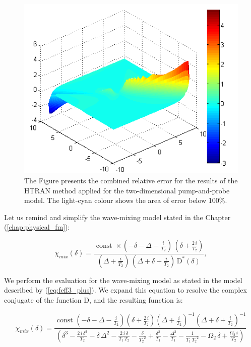 \documentclass[12pt,twoside,a4paper]{article}
\numberwithin{equation}{subsection}
\numberwithin{figure}{subsection}
\begin{document}
\begin{figure}
  \begin{center}
    \includegraphics{img/htran_pnp_3derr.png}
    \caption{The Figure presents the combined relative error for the results of the HTRAN method applied for the two-dimensional pump-and-probe model. The light-cyan colour shows the area of error below 100\%.  \label{fig:htran_pnp_3derr}}
  \end{center}
\end{figure} %

Let us remind and simplify the wave-mixing model stated in the Chapter (\ref{chap:physical_fm}):

\begin{equation} \label{eq:htran_fm}
	\chi_{mix} (\delta) =
      \frac { \text{ const } \times ( - \delta - \Delta - \frac{i}{ { T_{2} } } ) \, ( \delta  + \frac{2 \, i} { { T_{2} } } ) }
            { ( \Delta + \frac {i}{ { T_{2} } } ) \, ( \Delta  + \delta  + \frac {i}{ { T_{2} } } ) \, { \mathrm{D} } ^ {*} (\delta) },
\end{equation}

We perform the evaluation for the wave-mixing model as stated in the model described by (\ref{eq:feff3_plus}). We expand this equation to resolve the complex conjugate of the function D, and the resulting function is:

\begin{equation} \label{eq:htran_feffexp}
  \chi_{mix}( \delta ) = 
    \frac{ \text{ const } 
           ( - \delta - \Delta - \frac {i}{ T_{2} } ) 
           ( \delta + \frac{2 \, i}{ T_{2} } ) 
	       ( \Delta + \frac {i}{ T_{2} } ) ^ {-1} 
	       ( \Delta + \delta + \frac {i}{ T_{2} } ) ^ {-1} } 
	     { ( \delta^{3} 
	       - \frac{2 \, i \, \delta^{2} } { T_{2} } 
	       - \delta \,\Delta^{2} 
	       - \frac {2\,i\,\delta } { T_{1}  \, T_{2} } 
	       - \frac{ \delta }{ {T_{2} } ^ {2} } 
	       + \frac { \delta^{2} } { T_{1} } 
	       - \frac { \Delta^{2} } { T_{1} } 
	       - \frac {1}{ { T_{1} } \, {T_{2}}^{2}} 
	       - {\Omega_{2}}\,\delta  
	       + \frac { \Omega_{2} \, i} { T_{2} } ) }
\end{equation}	     
\end{document}
